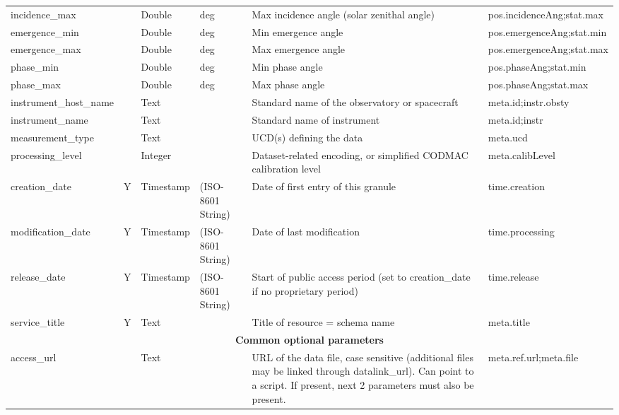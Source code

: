\documentclass[11pt,a4paper]{ivoa}
\begin{document}
\begin{longtable}{p{3.5cm}p{0.5cm}p{1cm}p{1cm}p{7cm}p{3cm}}
incidence\_max&&Double&deg&Max incidence angle (solar zenithal angle)& pos.incidenceAng;stat.max \\

emergence\_min&&Double&deg&Min emergence angle& pos.emergenceAng;stat.min \\

emergence\_max&&Double&deg&Max emergence angle& pos.emergenceAng;stat.max\\

phase\_min&&Double&deg&Min phase angle&pos.phaseAng;stat.min\\

phase\_max&&Double&deg&Max phase angle&pos.phaseAng;stat.max\\

instrument\_host\_name&&Text&&Standard name of the observatory or spacecraft&meta.id;instr.obsty\\

instrument\_name&&Text&&Standard name of instrument&meta.id;instr\\

measurement\_type&&Text&&UCD(s) defining the data&meta.ucd\\

processing\_level&&Integer&&Dataset-related encoding, or simplified CODMAC calibration level&meta.calibLevel\\

creation\_date&Y&Timestamp&(ISO-8601 String)&Date of first entry of this granule&time.creation\\

modification\_date&Y&Timestamp&(ISO-8601 String)&Date of last modification&time.processing\\

release\_date&Y&Timestamp&(ISO-8601 String)&Start of public access period (set to creation\_date if no proprietary period)&time.release\\

service\_title&Y&Text&&Title of resource = schema name&meta.title\\

\multicolumn{6}{c}{\vrule width 0pt height 20pt depth 12pt \textbf{\textbf{Common optional parameters}}}\\

access\_url&&Text&&URL of the data file, case sensitive (additional files may be linked through datalink\_url). Can point to a script. If present, next 2 parameters must also be present.&meta.ref.url;meta.file\\


\end{longtable}
\end{document}
